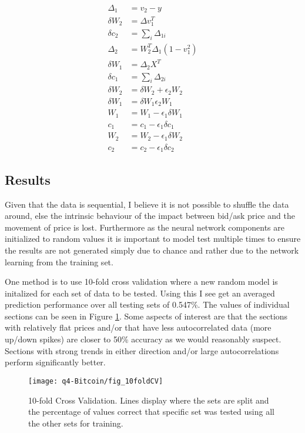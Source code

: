 \documentclass{article}
\begin{document}
\begin{equation}
	\begin{split}
		\Delta_1 &= v_2 - y \\
        \delta W_2 &= \Delta v_1^T \\
        \delta c_2 &= \sum_i \Delta_{1i} \\
        \Delta_2 &= W_2^T \Delta_1 (1 - v_1^2) \\
        \delta W_1 &= \Delta_2 X^T \\
        \delta c_1 &= \sum_i \Delta_{2i} \\
        \delta W_2 &= \delta W_2 + \epsilon_2 W_2 \\
        \delta W_1 &=  \delta W_1 \epsilon_2 W_1 \\
        W_1 &= W_1-\epsilon_1 \delta W_1 \\
        c_1 &= c_1-\epsilon_1 \delta c_1 \\
        W_2 &= W_2-\epsilon_1 \delta W_2 \\
        c_2 &= c_2 - \epsilon_1 \delta c_2 
	\end{split}
\end{equation}

\subsection{Results}
Given that the data is sequential, I believe it is not possible to shuffle the data around, else the intrinsic behaviour of the impact between bid/ask price and the movement of price is lost. Furthermore as the neural network components are initialized to random values it is important to model test multiple times to ensure the results are not generated simply due to chance and rather due to the network learning from the training set.

 One method is to use 10-fold cross validation where a new random model is initalized for each set of data to be tested.  Using this I see get an averaged prediction performance over all testing sets of 0.547\%. The values of individual sections can be seen in Figure \ref{fig:10CV}. Some aspects of interest are that the sections with relatively flat prices and/or that have less autocorrelated data (more up/down spikes) are closer to 50\% accuracy as we would reasonably suspect. Sections with strong trends in either direction and/or large autocorrelations perform significantly better. 

\begin{figure}[h!]
		\centering
		\texttt{[image: q4-Bitcoin/fig\_10foldCV]}
		\caption{10-fold Cross Validation. Lines display where the sets are split and the percentage of values correct that specific set was tested using all the other sets for training.}
		\label{fig:10CV}
\end{figure}
\end{document}
